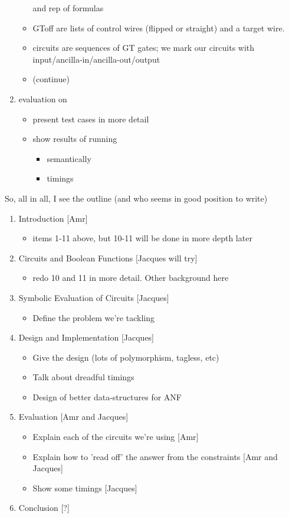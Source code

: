 \documentclass[sigplan]{acmart}
\begin{document}
\begin{enumerate}
\begin{itemize}
        and rep of formulas
      \item GToff are lists of control wires (flipped or straight) and a target wire.
      \item circuits are sequences of GT gates; we mark our circuits with input/ancilla-in/ancilla-out/output
      \item (continue)
    \end{itemize}
  \item evaluation on
    \begin{itemize}
      \item present test cases in more detail
      \item show results of running
        \begin{itemize}
          \item semantically
          \item timings
        \end{itemize}
    \end{itemize}
\end{enumerate}

So, all in all, I see the outline (and who seems in good position to write)
\begin{enumerate}
  \item Introduction [Amr]
    \begin{itemize}
      \item items 1-11 above, but 10-11 will be done in more depth later
    \end{itemize}
  \item Circuits and Boolean Functions [Jacques will try]
    \begin{itemize}
      \item redo 10 and 11 in more detail. Other background here
    \end{itemize}
  \item Symbolic Evaluation of Circuits [Jacques]
    \begin{itemize}
      \item Define the problem we're tackling
    \end{itemize}
  \item Design and Implementation [Jacques]
    \begin{itemize}
      \item Give the design (lots of polymorphism, tagless, etc)
      \item Talk about dreadful timings
      \item Design of better data-structures for ANF
    \end{itemize}
  \item Evaluation [Amr and Jacques]
    \begin{itemize}
      \item Explain each of the circuits we're using [Amr]
      \item Explain how to 'read off' the answer from the constraints [Amr and Jacques]
      \item Show some timings [Jacques]
    \end{itemize}
  \item Conclusion [?]
\end{enumerate}
\end{document}
